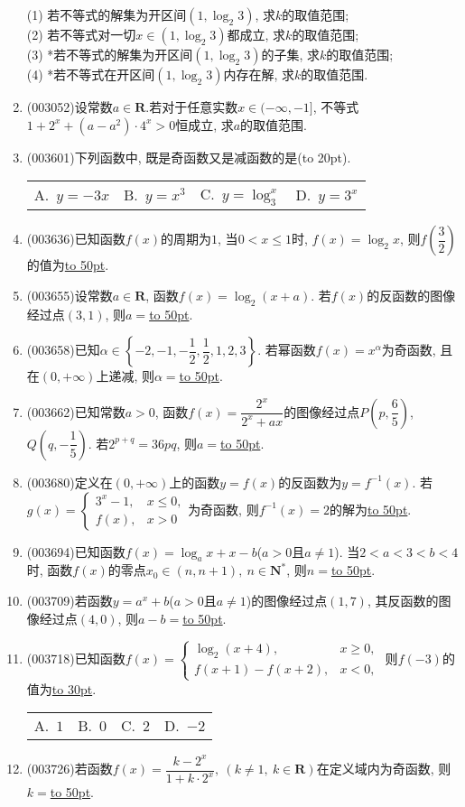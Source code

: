 \documentclass[10pt,a4paper]{article}
\newcommand{\blank}[1]{\underline{\hbox to #1pt{}}}
\newcommand{\bracket}[1]{(\hbox to #1pt{})}
\newcommand{\fourch}[4]{\par\begin{tabular}{p{.23\textwidth}p{.23\textwidth}p{.23\textwidth}p{.23\textwidth}}
A.~#1 &B.~#2& C.~#3& D.~#4
\end{tabular}}
\begin{document}
\begin{enumerate}[1.]
(1) 若不等式的解集为开区间$(1, \log_2 3)$, 求$k$的取值范围;\\
(2) 若不等式对一切$x\in (1,\log_2 3)$都成立, 求$k$的取值范围;\\
(3) *若不等式的解集为开区间$(1,\log_2 3)$的子集, 求$k$的取值范围;\\
(4) *若不等式在开区间$(1,\log_2 3)$内存在解, 求$k$的取值范围.
\item {\tiny (003052)}设常数$a\in \mathbf{R}$.若对于任意实数$x\in (-\infty ,-1]$, 不等式$1+2^x+(a-a^2)\cdot 4^x>0$恒成立, 求$a$的取值范围.
\item {\tiny (003601)}下列函数中, 既是奇函数又是减函数的是\bracket{20}.
\fourch{$y=-3x$}{$y=x^3$}{$y=\log_3^x$}{$y=3^x$}
\item {\tiny (003636)}已知函数$f(x)$的周期为$1$, 当$0<x\le 1$时, $f(x)=\log_2 x$, 则$f\left(\dfrac{3}{2}\right)$的值为\blank{50}.
\item {\tiny (003655)}设常数$a\in \mathbf{R}$, 函数$f(x)=\log_2(x+a)$. 若$f(x)$的反函数的图像经过点$(3,1)$, 则$a=$\blank{50}.
\item {\tiny (003658)}已知$\alpha\in \left\{-2,-1,-\dfrac{1}{2},\dfrac{1}{2},1,2,3\right\}$. 若幂函数$f(x)=x^{\alpha}$为奇函数, 且在$(0,+\infty)$上递减, 则$\alpha=$\blank{50}.
\item {\tiny (003662)}已知常数$a>0$, 函数$f(x)=\dfrac{2^x}{2^x+ax}$的图像经过点$P\left(p,\dfrac{6}{5}\right)$, $Q\left(q,-\dfrac{1}{5}\right)$. 若$2^{p+q}=36pq$, 则$a=$\blank{50}.
\item {\tiny (003680)}定义在$(0,+\infty)$上的函数$y=f(x)$的反函数为$y=f^{-1}(x)$. 若$g(x)=\begin{cases}3^x-1, & x\le 0,\\ f(x), & x>0\end{cases}$为奇函数, 则$f^{-1}(x)=2$的解为\blank{50}.
\item {\tiny (003694)}已知函数$f(x)=\log_a x+x-b$($a>0$且$a\ne 1$). 当$2<a<3<b<4$时, 函数$f(x)$的零点$x_0\in (n,n+1), \ n\in \mathbf{N}^*$, 则$n=$\blank{50}.
\item {\tiny (003709)}若函数$y=a^x+b$($a>0$且$a\ne 1$)的图像经过点$(1,7)$, 其反函数的图像经过点$(4,0)$, 则$a-b=$\blank{50}.
\item {\tiny (003718)}已知函数$f(x)=\begin{cases}
\log_2(x+4), & x\ge 0,\\f(x+1)-f(x+2), & x<0,\end{cases}$ 则$f(-3)$的值为\blank{30}.
\fourch{$1$}{$0$}{$2$}{$-2$}
\item {\tiny (003726)}若函数$f(x)=\dfrac{k-2^x}{1+k\cdot 2^x}, \ (k\ne 1, \ k\in \mathbf{R})$在定义域内为奇函数, 则$k=$\blank{50}.

\end{enumerate}
\end{document}
